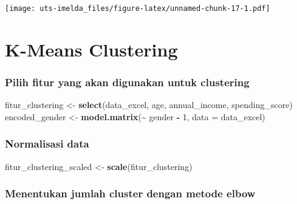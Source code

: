 \documentclass[
]{article}
\newenvironment{Shaded}{\begin{snugshade}}{\end{snugshade}}
\newcommand{\AttributeTok}[1]{\textcolor[rgb]{0.13,0.29,0.53}{#1}}
\newcommand{\DecValTok}[1]{\textcolor[rgb]{0.00,0.00,0.81}{#1}}
\newcommand{\FunctionTok}[1]{\textcolor[rgb]{0.13,0.29,0.53}{\textbf{#1}}}
\newcommand{\NormalTok}[1]{#1}
\newcommand{\OtherTok}[1]{\textcolor[rgb]{0.56,0.35,0.01}{#1}}
\newcommand{\SpecialCharTok}[1]{\textcolor[rgb]{0.81,0.36,0.00}{\textbf{#1}}}
\begin{document}
\texttt{[image: uts-imelda\_files/figure-latex/unnamed-chunk-17-1.pdf]}

\hypertarget{k-means-clustering}{%
\section{K-Means Clustering}\label{k-means-clustering}}

\hypertarget{pilih-fitur-yang-akan-digunakan-untuk-clustering}{%
\subsubsection{Pilih fitur yang akan digunakan untuk
clustering}\label{pilih-fitur-yang-akan-digunakan-untuk-clustering}}

\begin{Shaded}
\begin{Highlighting}[]
\NormalTok{fitur\_clustering }\OtherTok{\textless{}{-}} \FunctionTok{select}\NormalTok{(data\_excel, age, annual\_income, spending\_score)}
\NormalTok{encoded\_gender }\OtherTok{\textless{}{-}} \FunctionTok{model.matrix}\NormalTok{(}\SpecialCharTok{\textasciitilde{}}\NormalTok{ gender }\SpecialCharTok{{-}} \DecValTok{1}\NormalTok{, }\AttributeTok{data =}\NormalTok{ data\_excel)}
\end{Highlighting}
\end{Shaded}

\hypertarget{normalisasi-data}{%
\subsubsection{Normalisasi data}\label{normalisasi-data}}

\begin{Shaded}
\begin{Highlighting}[]
\NormalTok{fitur\_clustering\_scaled }\OtherTok{\textless{}{-}} \FunctionTok{scale}\NormalTok{(fitur\_clustering)}
\end{Highlighting}
\end{Shaded}

\hypertarget{menentukan-jumlah-cluster-dengan-metode-elbow}{%
\subsubsection{Menentukan jumlah cluster dengan metode
elbow}\label{menentukan-jumlah-cluster-dengan-metode-elbow}}
\end{document}
